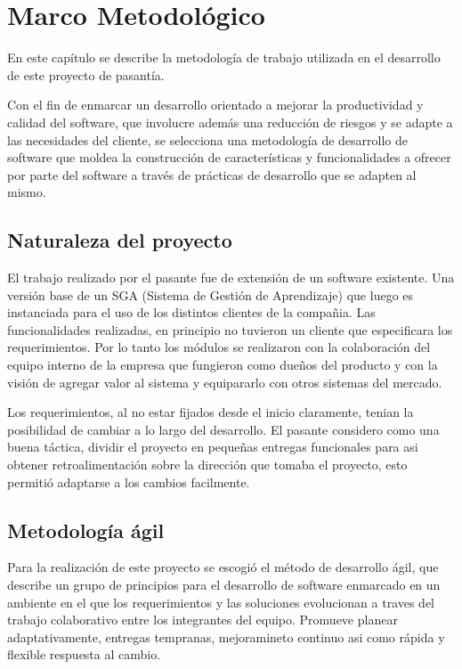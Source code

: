 \chapter{Marco Metodológico}
\thispagestyle{empty} %

En este capítulo se describe la metodología de trabajo utilizada en el desarrollo de este proyecto de pasantía.

Con el fin de enmarcar un desarrollo orientado a mejorar la productividad y calidad del software, que involucre además una reducción de riesgos y se adapte a las necesidades del cliente, se selecciona una metodología de desarrollo de software que moldea la construcción de características y funcionalidades a ofrecer por parte del software a través de prácticas de desarrollo que se adapten al mismo.

\section{Naturaleza del proyecto}
El trabajo realizado por el pasante fue de extensión de un software existente. Una versión base de un SGA (Sistema de Gestión de Aprendizaje) que luego es instanciada para el uso de los distintos clientes de la compañia. Las funcionalidades realizadas, en principio no tuvieron un cliente que especificara los requerimientos. Por lo tanto los módulos se realizaron con la colaboración del equipo interno de la empresa que fungieron como dueños del producto y con la visión de agregar valor al sistema y equipararlo con otros sistemas del mercado.

Los requerimientos, al no estar fijados desde el inicio claramente, tenian la posibilidad de cambiar a lo largo del desarrollo. El pasante considero como una buena táctica, dividir el proyecto en pequeñas entregas funcionales para asi obtener retroalimentación sobre la dirección que tomaba el proyecto, esto permitió adaptarse a los cambios facilmente.

\section{Metodología ágil}

Para la realización de este proyecto se escogió el método de desarrollo ágil, que describe un grupo de principios para el desarrollo de software enmarcado en un ambiente en el que los requerimientos  y las soluciones evolucionan a traves del trabajo colaborativo entre los integrantes del equipo. Promueve planear adaptativamente, entregas tempranas, mejoramineto continuo asi como rápida y flexible respuesta al cambio.

